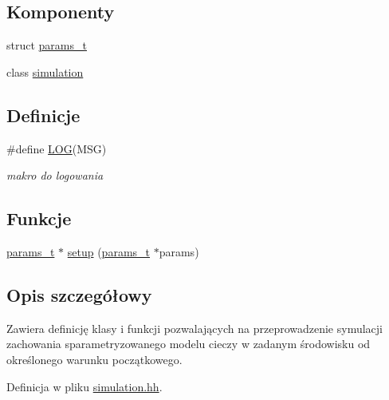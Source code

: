 \subsection*{Komponenty}
\begin{DoxyCompactItemize}
\item 
struct \hyperlink{structparams__t}{params\-\_\-t}
\item 
class \hyperlink{classsimulation}{simulation}
\end{DoxyCompactItemize}
\subsection*{Definicje}
\begin{DoxyCompactItemize}
\item 
\#define \hyperlink{simulation_8hh_acbd91a8a9a62657e2252a0a1f7c876e1}{L\-O\-G}(M\-S\-G)
\begin{DoxyCompactList}\small\item\em makro do logowania \end{DoxyCompactList}\end{DoxyCompactItemize}
\subsection*{Funkcje}
\begin{DoxyCompactItemize}
\item 
\hyperlink{structparams__t}{params\-\_\-t} $\ast$ \hyperlink{simulation_8hh_abf5adaaaf59fb394dd7b3c5d4bcaaa1a}{setup} (\hyperlink{structparams__t}{params\-\_\-t} $\ast$params)
\end{DoxyCompactItemize}


\subsection{Opis szczegółowy}
Zawiera definicję klasy i funkcji pozwalających na przeprowadzenie symulacji zachowania sparametryzowanego modelu cieczy w zadanym środowisku od określonego warunku początkowego. 

Definicja w pliku \hyperlink{simulation_8hh_source}{simulation.\-hh}.



